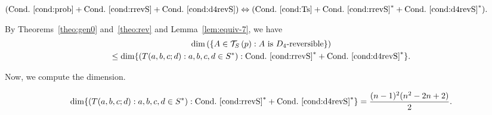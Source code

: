 \documentclass[AHL,Unicode,longabstracts]{cedram}
\newcounter{a}
\newcommand{\Cond}{Cond.}
\newcommand{\triang}[2]{\mathcal{T}_{#1} \left(#2 \right)}
\begin{document}
\begin{lemm}\label{lem:equiv-7}
$(\text{\Cond}~\ref{cond:prob} + \text{\Cond}~\ref{cond:rrevS} + \text{\Cond}~\ref{cond:d4revS}) \Leftrightarrow (\text{\Cond}~\ref{cond:Ts} + \text{\Cond}~\ref{cond:rrevS}^* + \text{\Cond}~\ref{cond:d4revS}^*).$
\end{lemm}

By Theorems~\ref{theo:gen0} and~\ref{theo:rev} and Lemma~\ref{lem:equiv-7}, we have
\begin{multline*}
\dim \left(\{A \in \triang{S}{p} : \text{$A$ is $D_4$-reversible}\} \right) \\
\leq \dim \{(T(a,b,c;d) : a,b,c,d \in S^*) : \text{\Cond}~\ref{cond:rrevS}^*+ \text{\Cond}~\ref{cond:d4revS}^*\}.
\end{multline*}

Now, we compute the dimension.

\begin{lemm}
\begin{equation*}
\dim \{(T(a,b,c;d) : a,b,c,d \in S^*) : \text{\Cond}~\ref{cond:rrevS}^* + \text{\Cond}~\ref{cond:d4revS}^*\} = \frac{(n-1)^2 (n^2-2n+2)}{2}.
\end{equation*}
\end{lemm}
\end{document}
